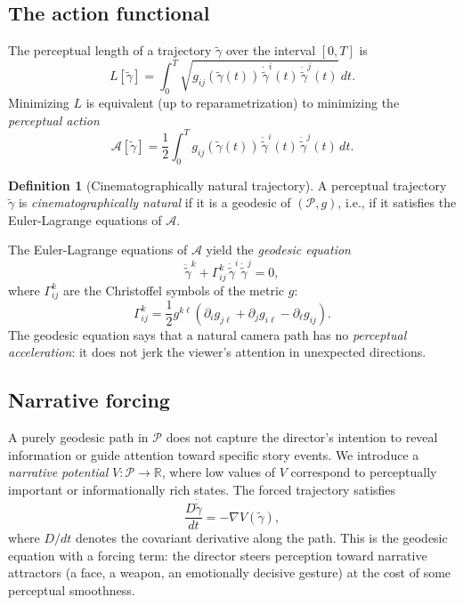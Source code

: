 \documentclass[12pt,a4paper]{article}
\theoremstyle{plain}
\theoremstyle{definition}
\newtheorem{definition}[theorem]{Definition}
\begin{document}
\subsection{The action functional}

The perceptual length of a trajectory $\tilde\gamma$ over the interval $[0,T]$
is
\[
L[\tilde\gamma] = \int_0^T
\sqrt{g_{ij}(\tilde\gamma(t))\,\dot{\tilde\gamma}^i(t)\,\dot{\tilde\gamma}^j(t)}
\,dt.
\]
Minimizing $L$ is equivalent (up to reparametrization) to minimizing the
\emph{perceptual action}
\[
\mathcal{A}[\tilde\gamma]
= \frac{1}{2}\int_0^T
g_{ij}(\tilde\gamma(t))\,\dot{\tilde\gamma}^i(t)\,\dot{\tilde\gamma}^j(t)
\,dt.
\]

\begin{definition}[Cinematographically natural trajectory]
A perceptual trajectory $\tilde\gamma$ is \emph{cinematographically natural} if
it is a geodesic of $(\mathcal{P},g)$, i.e., if it satisfies the Euler-Lagrange
equations of $\mathcal{A}$.
\end{definition}

The Euler-Lagrange equations of $\mathcal{A}$ yield the \emph{geodesic equation}
\[
\ddot{\tilde\gamma}^k + \Gamma^k_{ij}\,\dot{\tilde\gamma}^i\,\dot{\tilde\gamma}^j = 0,
\]
where $\Gamma^k_{ij}$ are the Christoffel symbols of the metric $g$:
\[
\Gamma^k_{ij} = \frac{1}{2}g^{k\ell}
\!\left(
\partial_i g_{j\ell} + \partial_j g_{i\ell} - \partial_\ell g_{ij}
\right).
\]
The geodesic equation says that a natural camera path has no \emph{perceptual
acceleration}: it does not jerk the viewer's attention in unexpected directions.

\subsection{Narrative forcing}

A purely geodesic path in $\mathcal{P}$ does not capture the director's
intention to reveal information or guide attention toward specific story events.
We introduce a \emph{narrative potential} $V:\mathcal{P}\to\mathbb{R}$, where
low values of $V$ correspond to perceptually important or informationally rich
states. The forced trajectory satisfies
\[
\frac{D\dot{\tilde\gamma}}{dt} = -\nabla V(\tilde\gamma),
\]
where $D/dt$ denotes the covariant derivative along the path. This is the
geodesic equation with a forcing term: the director steers perception toward
narrative attractors (a face, a weapon, an emotionally decisive gesture) at the
cost of some perceptual smoothness.
\end{document}
